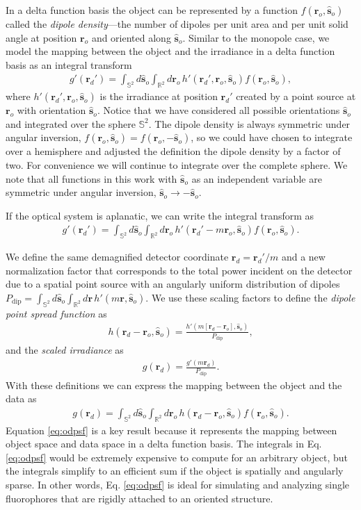 \documentclass[]{osa-article}
\providecommand{\mb}[1]{\mathbf{#1}}
\providecommand{\ro}{\mathbf{\mathbf{r}}_o}
\providecommand{\so}{\mathbf{\hat{s}}_o}
\providecommand{\rd}{\mathbf{r}_d}
\providecommand{\mbb}[1]{\mathbb{#1}}
\begin{document}
In a delta function basis the object can be represented by a function
$f(\ro, \so)$ called the \textit{dipole density}---the number of dipoles per
unit area and per unit solid angle at position $\ro{}$ and oriented along
$\so{}$. Similar to the monopole case, we model the mapping between the object
and the irradiance in a delta function basis as an integral transform
\begin{align}
  g'(\rd') = \int_{\mbb{S}^2}d\so\int_{\mbb{R}^2}d\ro\, h'(\rd', \ro, \so)f(\ro, \so),
\end{align}
where $h'(\rd', \ro, \so)$ is the irradiance at position $\rd'$ created by a
point source at $\ro$ with orientation $\so$. Notice that we have considered all
possible orientations $\so$ and integrated over the sphere $\mbb{S}^2$. The
dipole density is always symmetric under angular inversion,
$f(\ro, \so) = f(\ro,-\so)$, so we could have chosen to integrate over a
hemisphere and adjusted the definition the dipole density by a factor of two.
For convenience we will continue to integrate over the complete sphere. We note
that all functions in this work with $\so$ as an independent variable are
symmetric under angular inversion, $\so \rightarrow -\so$.

If the optical system is aplanatic, we can write the
integral transform as
\begin{align}
  g'(\rd') = \int_{\mbb{S}^2}d\so\int_{\mbb{R}^2}d\ro\, h'(\rd' - m\ro, \so)f(\ro, \so). 
\end{align}

We define the same demagnified detector coordinate $\rd = \rd'/m$ and a new
normalization factor that corresponds to the total power incident on the
detector due to a spatial point source with an angularly uniform distribution of
dipoles
$P_\text{dip} = \int_{\mbb{S}^2}d\so\int_{\mbb{R}^2}d\mb{r}\, h'(m\mb{r},
\so)$. We use these scaling factors to define the
\textit{dipole point spread function} as
\begin{align}
  h(\rd - \ro, \so) = \frac{h'(m[\rd - \ro], \so)}{P_\text{dip}}, 
\end{align}
and the \textit{scaled irradiance} as 
\begin{align}
  g(\rd) = \frac{g'(m\rd)}{P_\text{dip}}. 
\end{align}
With these definitions we can express the mapping between the object and the
data as
\begin{align}
g(\rd{}) = \int_{\mbb{S}^2}d\so{}\int_{\mbb{R}^2}d\ro{}\, h(\rd{} -\ro{}, \so{})f(\ro, \so). \label{eq:odpsf}
\end{align}
Equation \eqref{eq:odpsf} is a key result because it represents the mapping
between object space and data space in a delta function basis. The integrals in
Eq. \eqref{eq:odpsf} would be extremely expensive to compute for an arbitrary
object, but the integrals simplify to an efficient sum if the object is
spatially and angularly sparse. In other words, Eq. \eqref{eq:odpsf} is ideal for
simulating and analyzing single fluorophores that are rigidly attached to an
oriented structure.
\end{document}
